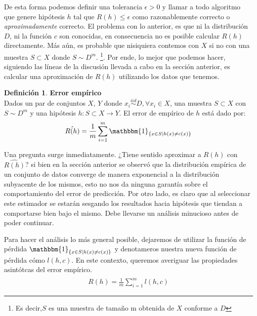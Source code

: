 \documentclass{book}
\theoremstyle{plain}
\theoremstyle{definition}
\newtheorem{defn}{Definición}[section]
\theoremstyle{remark}
\begin{document}
De esta forma podemos definir una tolerancia $\epsilon > 0$ y llamar a todo algoritmo que genere hipótesis $h$ tal que $R(h)\leq\epsilon$ como razonablemente correcto o \emph{aproximadamente} correcto. El problema con lo anterior, es que ni la distribución $D$, ni la función $c$ son conocidas, en consecuencia no es posible calcular $R(h)$ directamente. Más aún, es probable que nisiquiera contemos con $X$ si no con una muestra $S \subset X$ donde $S \sim D^m$. \footnote{Es decir,$S$ es una muestra de tamaño m obtenida de $X$  conforme a $D$}. Por ende, lo mejor que podemos hacer, siguiendo las líneas de la discusión llevada a cabo en la sección anterior, es calcular una aproximación de $R(h)$ utilizando los datos que tenemos.
\bigskip

\begin{defn}\label{eq:def_emp_err}
\textbf{Error empírico}\\  Dados un par de conjuntos $X$, $Y$ donde $x_i \stackrel{iid}{\sim} D,\forall x_i\in X$, una muestra $S\subset X$ con $S\sim D^m$ y una hipótesis $h:S\subset X\rightarrow Y$. El error de empírico de $h$ está dado por:
\begin{equation*}
\hat{R(h)}=\frac{1}{m}\displaystyle\sum_{i=1}^m\mathbbm{1}_{\{x\in S| h(x)\neq c(x)\}}
\end{equation*}
\end{defn}

Una pregunta surge inmediatamente. ¿Tiene sentido aproximar a $R(h)$ con $\hat{R(h)}$? si bien en la sección anterior se observó que la distribución empírica de un conjunto de datos converge de manera exponencial a la distribución subyacente de los mismos, esto no nos da ninguna garantía sobre el comportamiento del error de predicción. Por otro lado, es claro que al seleccionar este estimador se estarán sesgando los resultados hacia hipótesis que tiendan a comportarse bien bajo el mismo. Debe llevarse un análisis minucioso antes de poder continuar.  

Para hacer el análisis lo más general posible, dejaremos de utilizar la función de pérdida $\mathbbm{1}_{\{x\in S| h(x)\neq c(x)\}}$ y denotameros nuestra nueva función de pérdida cómo $l(h,c)$. En este contexto, queremos averiguar las propiedades asintótcas del error empírico. 
\begin{equation*}
\begin{split}
\hat{R(h)}=\frac{1}{m}\displaystyle\sum_{i=1}^m l(h,c)
\end{split}
\end{equation*}
\end{document}
